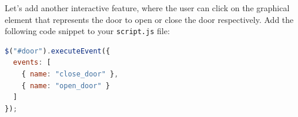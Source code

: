 Let's add another interactive feature, where the user can click on the graphical element that represents the door to open or close the door respectively.
%
Add the following code snippet to your \texttt{script.js} file:
\begin{lstlisting}[language=JavaScript, caption={Interaction with the Lift Door (JavaScript)}]
$("#door").executeEvent({
  events: [
    { name: "close_door" }, 
    { name: "open_door" }
  ]
});
\end{lstlisting}

